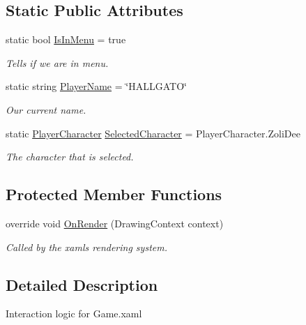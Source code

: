 \subsection*{Static Public Attributes}
\begin{DoxyCompactItemize}
\item 
static bool \mbox{\hyperlink{class_o_e_invaders_1_1_game_a114778007490c8fd9134ddd5acaac808}{Is\+In\+Menu}} = true
\begin{DoxyCompactList}\small\item\em Tells if we are in menu. \end{DoxyCompactList}\item 
static string \mbox{\hyperlink{class_o_e_invaders_1_1_game_a627772f162c781b3280353c111eada3b}{Player\+Name}} = \char`\"{}H\+A\+L\+L\+G\+A\+TO\char`\"{}
\begin{DoxyCompactList}\small\item\em Our current name. \end{DoxyCompactList}\item 
static \mbox{\hyperlink{namespace_o_e_invaders_1_1_library_ad161194088b9101570c071d1baa1d2c7}{Player\+Character}} \mbox{\hyperlink{class_o_e_invaders_1_1_game_a3bbb06cdfd105f4afc89bc00890a19ef}{Selected\+Character}} = Player\+Character.\+Zoli\+Dee
\begin{DoxyCompactList}\small\item\em The character that is selected. \end{DoxyCompactList}\end{DoxyCompactItemize}
\subsection*{Protected Member Functions}
\begin{DoxyCompactItemize}
\item 
override void \mbox{\hyperlink{class_o_e_invaders_1_1_game_a67abbd985ea58a580e35f159471dd26f}{On\+Render}} (Drawing\+Context context)
\begin{DoxyCompactList}\small\item\em Called by the xaml\textquotesingle{}s rendering system. \end{DoxyCompactList}\end{DoxyCompactItemize}


\subsection{Detailed Description}
Interaction logic for Game.\+xaml 

